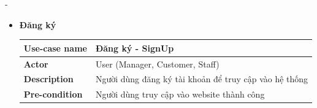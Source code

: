 \begin {list} {-}{}
\begin{itemize}
    \item \textbf{Đăng ký}
    \begin{table}[H]
        \begin{tabular}{|l|l|}
        \hline
        \textbf{Use-case name}    & \textbf{Đăng ký - SignUp}                                                                                                                                                                                                                                                                                                                                                                                                                                                                                                                              \\ \hline
        \textbf{Actor}            & User (Manager, Customer, Staff)                                                                                                                                                                                                                                                                                                                                                                                                                                                                                                                        \\ \hline
        \textbf{Description}      & Người dùng đăng ký tài khoản để truy cập vào hệ thống                                                                                                                                                                                                                                                                                                                                                                                                                                                                                                  \\ \hline
        \textbf{Pre-condition}    & Người dùng truy cập vào website thành công                                                                                                                                                                                                                                                                                                                                                                                                                                                                                                             \\ \hline

\end{tabular}
\end{table}
\end{itemize}
\end{list}
